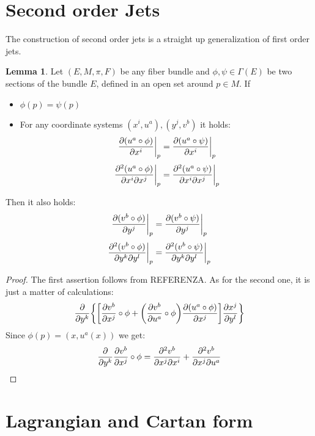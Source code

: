 \documentclass[12pt,a4paper]{report}
\theoremstyle{definition}
\theoremstyle{Theorem}
\newtheorem{Lm}[Def]{Lemma}
\theoremstyle{definition}
\theoremstyle{definition}
\begin{document}
	\section{Second order Jets}
	The construction of second order jets is a straight up generalization of first order jets.
	\begin{Lm}
		Let $(E,M,\pi,F)$ be any fiber bundle and $\phi,\psi\in\Gamma(E)$ be two sections of the bundle $E$, defined in an open set around $p\in M$. If
		\begin{itemize}
			\item $\phi(p)=\psi(p)$ 
			\item For any coordinate systems $(x^i,u^a),(y^j,v^b)$ it holds:
			$${\partial(u^a\circ\phi) \over \partial{x^i}}\bigg|_p={\partial(u^a\circ\psi) \over \partial{x^i}}\bigg|_p$$
			$${\partial^2(u^a\circ\phi) \over \partial{x^i}\partial{x^j}}\bigg|_p={\partial^2(u^a\circ\psi) \over \partial{x^i}\partial{x^j}}\bigg|_p$$
		\end{itemize} 
		Then it also holds:
		$${\partial(v^b\circ\phi) \over \partial{y^j}}\bigg|_p={\partial(v^b\circ\psi) \over \partial{y^j}}\bigg|_p$$
		$${\partial^2(v^b\circ\phi) \over \partial{y^k}\partial{y^l}}\bigg|_p={\partial^2(v^b\circ\psi) \over \partial{y^k}\partial{y^l}}\bigg|_p$$
	\end{Lm}
	\begin{proof}
		The first assertion follows from REFERENZA. As for the second one, it is just a matter of calculations:
		$${\partial\over \partial y^k}\bigg\{\bigg[{\partial v^b\over \partial{x^j}}\circ \phi+\bigg({\partial v^b\over \partial{u^a}}\circ \phi\bigg) {\partial(u^a\circ \phi)\over \partial{x^j}}\bigg]{\partial x^j\over  \partial y^l}\bigg\}$$
		Since $\phi(p)=(x,u^a(x))$ we get:
		$${\partial\over \partial y^k}{\partial v^b\over \partial{x^j}}\circ \phi=
		{\partial^2 v^b\over \partial{x^j}\partial x^i}+{\partial^2 v^b\over \partial{x^j}\partial u^a}$$
	\end{proof}
	\section{Lagrangian and Cartan form}
	
\end{document}
